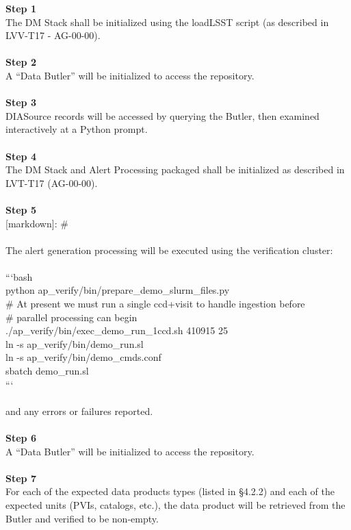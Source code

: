 \textbf{Step 1}\\
The DM Stack shall be initialized using the loadLSST script (as
described in LVV-T17 - AG-00-00).\\
~\\
\textbf{Step 2}\\
A ``Data Butler'' will be initialized to access the repository.\\
~\\
\textbf{Step 3}\\
DIASource records will be accessed by querying the Butler, then examined
interactively at a Python prompt.\\
~\\
\textbf{Step 4}\\
The DM Stack and Alert Processing packaged shall be initialized as
described in LVT-T17 (AG-00-00).\\
~\\
\textbf{Step 5}\\
{[}markdown{]}: \#\\
~\\
The alert generation processing will be executed using the verification
cluster:\\
~\\
```bash\\
python ap\_verify/bin/prepare\_demo\_slurm\_files.py\\
\# At present we must run a single ccd+visit to handle ingestion
before\\
\# parallel processing can begin\\
./ap\_verify/bin/exec\_demo\_run\_1ccd.sh 410915 25\\
ln -s ap\_verify/bin/demo\_run.sl\\
ln -s ap\_verify/bin/demo\_cmds.conf\\
sbatch demo\_run.sl\\
```\\
~\\
and any errors or failures reported.\\
~\\
\textbf{Step 6}\\
A ``Data Butler'' will be initialized to access the repository.\\
~\\
\textbf{Step 7}\\
For each of the expected data products types (listed in §4.2.2) and each
of the expected units (PVIs, catalogs, etc.), the data product will be
retrieved from the Butler and verified to be non-empty.\\

